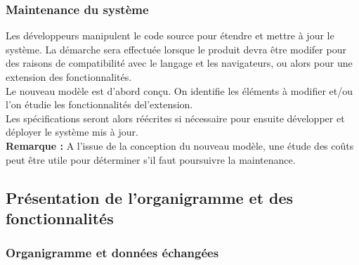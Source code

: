 			\subsubsection{Maintenance du système}
				Les développeurs manipulent le code source pour étendre et mettre à jour le système. La démarche sera effectuée lorsque le produit devra être modifer pour des raisons de compatibilité avec le langage et les navigateurs, ou alors pour une extension des fonctionnalités.\\
				Le nouveau modèle est d'abord conçu. On identifie les éléments à modifier et/ou l'on étudie les fonctionnalités del'extension.\\
				Les spécifications seront alors réécrites si nécessaire pour ensuite développer et déployer le système mis à jour.\\
				\textbf{Remarque :} A l'issue de la conception du nouveau modèle, une étude des coûts peut être utile pour déterminer s'il faut poursuivre la maintenance.
				
		\subsection{Présentation de l'organigramme et des fonctionnalités}
		
			\subsubsection{Organigramme et données échangées}
			

